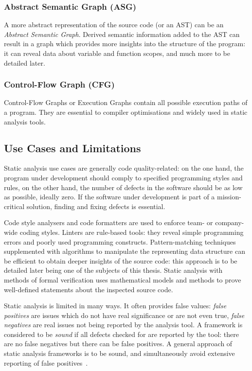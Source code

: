 \subsubsection{Abstract Semantic Graph (ASG)}

A more abstract representation of the source code (or an AST) can be an \emph{Abstract Semantic Graph}. Derived semantic information added to the AST can result in a graph which provides more insights into the structure of the program: it can reveal data about variable and function scopes, and much more to be detailed later.


\subsubsection{Control-Flow Graph (CFG)}

Control-Flow Graphs or Execution Graphs contain all possible execution paths of a program. They are essential to compiler optimisations and widely used in static analysis tools.


\subsection{Use Cases and Limitations}

Static analysis use cases are generally code quality-related: on the one hand, the program under development should comply to specified programming styles and rules, on the other hand, the number of defects in the software should be as low as possible, ideally zero. If the software under development is part of a mission-critical solution, finding and fixing defects is essential.

Code style analysers and code formatters are used to enforce team- or company-wide coding styles. Linters are rule-based tools: they reveal simple programming errors and poorly used programming constructs. Pattern-matching techniques supplemented with algorithms to manipulate the representing data structure can be efficient to obtain deeper insights of the source code: this approach is to be detailed later being one of the subjects of this thesis. Static analysis with methods of formal verification uses mathematical models and methods to prove well-defined statements about the inspected source code.

Static analysis is limited in many ways. It often provides false values: \emph{false positives} are issues which do not have real significance or are not even true, \emph{false negatives} are real issues not being reported by the analysis tool. A framework is considered to be \emph{sound} if all defects checked for are reported by the tool: there are no false negatives but there can be false positives. A general approach of static analysis frameworks is to be sound, and simultaneously avoid extensive reporting of false positives~\cite{emanuelsson2008comparative}.

